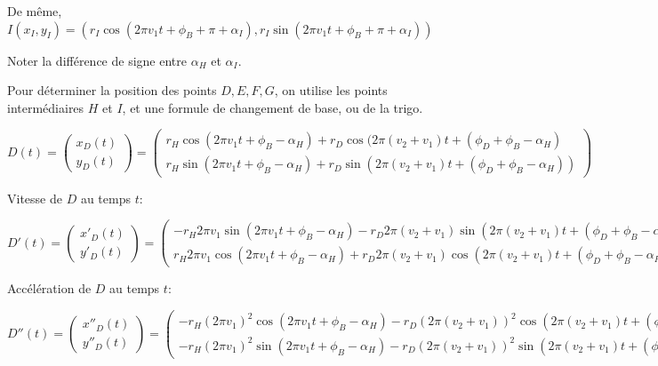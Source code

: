 \documentclass[11pt,a4paper]{article}
\begin{document}
De même,
$I(x_I,y_I) = ( r_I \cos(2 \pi v_1 t + \phi_B + \pi + \alpha_I),  r_I \sin(2 \pi v_1 t + \phi_B + \pi + \alpha_I))$

Noter la différence de signe entre $\alpha_H$ et $\alpha_I$.

Pour déterminer la position des points $D,E,F,G$, on utilise les points intermédiaires $H$ et $I$, et une formule de changement de base, ou de la trigo.



$
D(t)=
\begin{pmatrix}
x_D(t) \\ 
y_D(t)
\end{pmatrix}
=
\begin{pmatrix}
r_H \cos(2 \pi v_1 t + \phi_B- \alpha_H )  + r_D \cos(2 \pi (v_2 + v _1)t + (\phi_D + \phi_B - \alpha_H) \\ 
r_H \sin(2 \pi v_1 t + \phi_B - \alpha_H) + r_D \sin(2 \pi (v_2 +v_1)t +  (\phi_D + \phi_B - \alpha_H))  
\end{pmatrix}
$


Vitesse de $D$ au temps $t$:

$
D'(t)=
\begin{pmatrix}
x'_D(t) \\ 
y'_D(t)
\end{pmatrix}
=
\begin{pmatrix}
- r_H  2 \pi v_1 \sin(2 \pi v_1 t + \phi_B - \alpha_H) - r_D 2 \pi (v_2 + v _1) \sin(2 \pi (v_2 + v _1)t + (\phi_D + \phi_B - \alpha_H)) \\ 
  r_H  2 \pi  v_1 \cos(2 \pi v_1 t + \phi_B - \alpha_H) + r_D  2 \pi (v_2 + v _1) \cos(2 \pi (v_2 +v_1)t +  (\phi_D + \phi_B - \alpha_H))  
\end{pmatrix}
$


Accélération de $D$ au temps $t$:

$
D''(t)=
\begin{pmatrix}
x''_D(t) \\ 
y''_D(t)
\end{pmatrix}
=
\begin{pmatrix}
-r_H (2 \pi v_1)^2 \cos(2 \pi v_1 t + \phi_B - \alpha_H) - r_D  (2 \pi (v_2 + v _1))^2 \cos(2 \pi (v_2 + v _1)t + (\phi_D + \phi_B- \alpha_H)) \\ 
- r_H (2 \pi  v_1)^2 \sin(2 \pi v_1 t + \phi_B - \alpha_H) - r_D  (2 \pi (v_2 + v _1))^2 \sin(2 \pi (v_2 +v_1)t +  (\phi_D + \phi_B - \alpha_H))  )  
\end{pmatrix}
$
\end{document}
